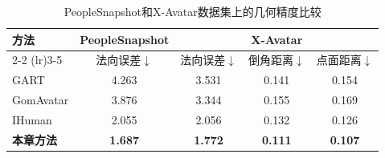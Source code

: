 \begin{table}[htbp]
	\centering\small
	\caption{PeopleSnapshot和X-Avatar数据集上的几何精度比较}
	\label{tab:geo}
	\renewcommand{\arraystretch}{1.2} 
	\setlength{\tabcolsep}{9pt}
	\begin{tabular}{l *{1}{cccc}}
		\toprule
		\multirow{2}{*}{\textbf{方法}}            &
		\multicolumn{1}{c}{\textbf{PeopleSnapshot}} & \multicolumn{3}{c}{\textbf{X-Avatar}}                                                     \\
		\cmidrule(lr){2-2} \cmidrule(lr){3-5}       &
		法向误差$\downarrow$ & 法向误差$\downarrow$  & 倒角距离$\downarrow$ & 点面距离$\downarrow$                  \\
		
		\midrule
		
		GART
		& 4.263        & 3.531          & 0.141           & 0.154          \\
		GomAvatar
		& 3.876        & 3.344          & 0.155           & 0.169          \\
		IHuman
		& 2.055        & 2.056          & 0.132           & 0.126          \\
		\midrule
		\textbf{本章方法}
		& \textbf{1.687}  & \textbf{1.772} & \textbf{0.111}  & \textbf{0.107} \\
		\bottomrule
	\end{tabular}
\end{table}
